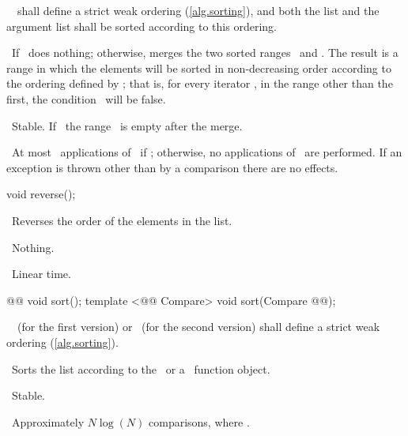 \documentclass[american,twoside]{book}
\begin{document}
\begin{itemdescr}
\pnum
\requires\ 
\ shall define a strict weak ordering
(\ref{alg.sorting}), and both the list and the argument list shall be
sorted according to this ordering.

\pnum
\effects\ 
If
\
does nothing; otherwise, merges the two sorted ranges
\tcode{[begin(), end())}\
and
\tcode{[x.\brk{}begin(), x.end())}.
The result is a range in which the elements will be sorted in non-decreasing
order according to the ordering defined by ;
that is, for every iterator , in the range other than the first,
the condition
\tcode{comp(*i, *(i - 1)}\
will be false.

\pnum
\notes\ 
Stable. If \ the range \tcode{[x.begin(), x.end())}\
is empty after the merge.

\pnum
\complexity\ 
At most
\
applications of \ if
;
otherwise, no applications of \tcode{comp}\ are performed.
If an exception is thrown other than by a comparison there are no effects.
\end{itemdescr}

%
\begin{itemdecl}
void reverse();
\end{itemdecl}

\begin{itemdescr}
\pnum
\effects\ 
Reverses the order of the elements in the list.

\pnum
\throws\ 
Nothing.

\pnum
\complexity\ 
Linear time.
\end{itemdescr}

%
\begin{itemdecl}
@@ void sort();
template <@@ Compare> void sort(Compare @@);
\end{itemdecl}

\begin{itemdescr}
\pnum
\requires\ 
\
(for the first
version)
or
\ 
(for the second version)
shall define a strict weak ordering (\ref{alg.sorting}).

\pnum
\effects\ 
Sorts the list according to the
\
or a
\
function object.

\pnum
\notes\ 
Stable.

\pnum
\complexity\ 
Approximately
$N \log(N)$
comparisons, where
\tcode{N == size()}.
\end{itemdescr}
\end{document}

